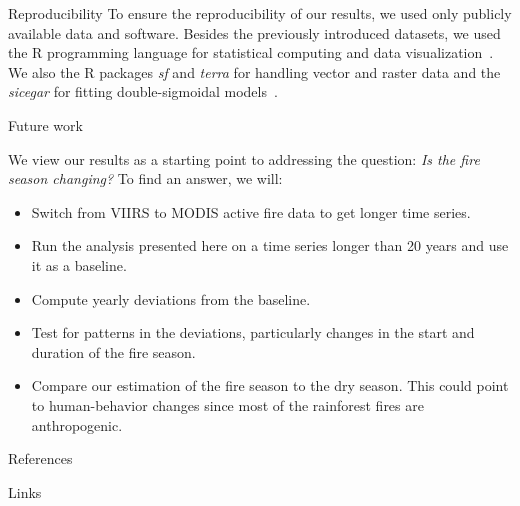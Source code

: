 \documentclass[20pt]{beamer}
\newcommand{\R}{R}
\begin{document}
\begin{frame}[fragile,t]
\begin{columns}[t]
\begin{column}{0.33\linewidth}
    \begin{block}{Reproducibility\vphantom{g}}
        \vspace{0.5cm}
        To ensure the reproducibility of our results, we used only publicly available data and software.
        Besides the previously introduced datasets, we used the \R{} programming language for statistical computing and data visualization~\cite{ihaka1996}.
        We also the \R{} packages \textit{sf} and \textit{terra} for handling vector and raster data and the \textit{sicegar} for fitting double-sigmoidal models~\cite{pebesma2018,hijmans2020,caglar2018}.
    \end{block}

    \begin{block}{Future work\vphantom{g}}

        \vspace{0.5cm}

We view our results as a starting point to addressing the question: \textit{Is the fire season changing?}
To find an answer, we will:
\begin{itemize}
    \item Switch from VIIRS to MODIS active fire data to get longer time series.
    \item Run the analysis presented here on a time series longer than 20 years and use it as a baseline.
    \item Compute yearly deviations from the baseline.
    \item Test for patterns in the deviations, particularly changes in the start and duration of the fire season.
    \item Compare our estimation of the fire season to the dry season. This could point to human-behavior changes since most of the rainforest fires are anthropogenic.
\end{itemize}
    \end{block}

\vspace{0.5cm}

    \begin{block}{References\vphantom{g}}

\vspace{0.5cm}    



    \end{block}

\vspace{0.5cm}

    \begin{block}{Links}


\end{block}
\end{column}
\end{columns}
\end{frame}
\end{document}
